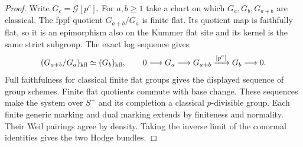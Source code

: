 \begin{proof}
Write \(G_c=\mathcal G[p^c]\). For \(a,b\ge1\) take a chart on which
\(G_a,G_b,G_{a+b}\) are classical. The fppf quotient \(G_{a+b}/G_a\)
is finite flat. Its quotient map is faithfully flat, so it is an
epimorphism also on the Kummer flat site and its kernel is the
same strict subgroup. The exact log sequence gives
\[
        (G_{a+b}/G_a)_{\rm kfl}\simeq (G_b)_{\rm kfl},
       \qquad 0\longrightarrow G_a\longrightarrow G_{a+b}
                 \xrightarrow{[p^a]}G_b\longrightarrow0 .
\]
Full faithfulness for classical finite flat groups gives the
displayed sequence of group schemes. Finite flat quotients commute
with base change. These sequences make the system over \(S^+\)
and its completion a classical \(p\)-divisible group. Each finite
generic marking and dual marking extends by finiteness and normality.
Their Weil pairings agree by density. Taking the inverse limit of
the conormal identities gives the two Hodge bundles.

\end{proof}

